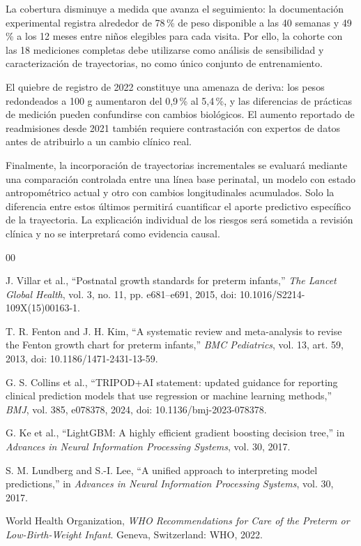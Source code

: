 \documentclass[conference,letterpaper]{IEEEtran}
\begin{document}
La cobertura disminuye a medida que avanza el seguimiento: la documentación experimental registra alrededor de 78\,\% de peso disponible a las 40 semanas y 49\,\% a los 12 meses entre niños elegibles para cada visita. Por ello, la cohorte con las 18 mediciones completas debe utilizarse como análisis de sensibilidad y caracterización de trayectorias, no como único conjunto de entrenamiento.

El quiebre de registro de 2022 constituye una amenaza de deriva: los pesos redondeados a 100 g aumentaron del 0,9\,\% al 5,4\,\%, y las diferencias de prácticas de medición pueden confundirse con cambios biológicos. El aumento reportado de readmisiones desde 2021 también requiere contrastación con expertos de datos antes de atribuirlo a un cambio clínico real.

Finalmente, la incorporación de trayectorias incrementales se evaluará mediante una comparación controlada entre una línea base perinatal, un modelo con estado antropométrico actual y otro con cambios longitudinales acumulados. Solo la diferencia entre estos últimos permitirá cuantificar el aporte predictivo específico de la trayectoria. La explicación individual de los riesgos será sometida a revisión clínica y no se interpretará como evidencia causal.

\begin{thebibliography}{00}

J. Villar et al., ``Postnatal growth standards for preterm infants,'' \textit{The Lancet Global Health}, vol. 3, no. 11, pp. e681--e691, 2015, doi: 10.1016/S2214-109X(15)00163-1.

T. R. Fenton and J. H. Kim, ``A systematic review and meta-analysis to revise the Fenton growth chart for preterm infants,'' \textit{BMC Pediatrics}, vol. 13, art. 59, 2013, doi: 10.1186/1471-2431-13-59.

G. S. Collins et al., ``TRIPOD+AI statement: updated guidance for reporting clinical prediction models that use regression or machine learning methods,'' \textit{BMJ}, vol. 385, e078378, 2024, doi: 10.1136/bmj-2023-078378.

G. Ke et al., ``LightGBM: A highly efficient gradient boosting decision tree,'' in \textit{Advances in Neural Information Processing Systems}, vol. 30, 2017.

S. M. Lundberg and S.-I. Lee, ``A unified approach to interpreting model predictions,'' in \textit{Advances in Neural Information Processing Systems}, vol. 30, 2017.

World Health Organization, \textit{WHO Recommendations for Care of the Preterm or Low-Birth-Weight Infant}. Geneva, Switzerland: WHO, 2022.

\end{thebibliography}
\end{document}
